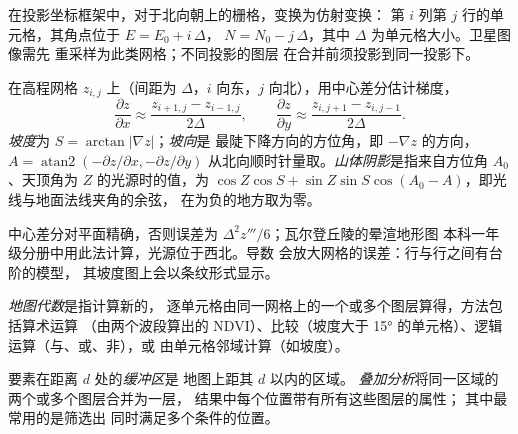 在投影坐标框架中，对于北向朝上的栅格，变换为仿射变换：
第 $i$ 列第 $j$ 行的单元格，其角点位于 $E = E_0 + i\,\Delta$，
$N = N_0 - j\,\Delta$，其中 $\Delta$ 为单元格大小。卫星图像需先
重采样为此类网格；不同投影的图层
在合并前须投影到同一投影下。

\begin{method}\label{met:b3:remote-sensing-gis:slope}
在高程网格 $z_{i,j}$ 上（间距为 $\Delta$，$i$ 向东，$j$
向北），用中心差分估计梯度，
\[
\frac{\partial z}{\partial x} \approx \frac{z_{i+1,j} - z_{i-1,j}}{2\Delta} ,
\qquad
\frac{\partial z}{\partial y} \approx \frac{z_{i,j+1} - z_{i,j-1}}{2\Delta} .
\]
\emph{坡度}为 $S = \arctan|\nabla z|$；\emph{坡向}是
最陡下降方向的方位角，即 $-\nabla z$ 的方向，$A =
\operatorname{atan2}(-\partial z/\partial x, -\partial z/\partial y)$
从北向顺时针量取。\emph{山体阴影}是指来自方位角
$A_0$、天顶角为 $Z$ 的光源时的值，为 $\cos Z\cos S + \sin Z\sin S
\cos(A_0 - A)$，即光线与地面法线夹角的余弦，
在为负的地方取为零。
\end{method}

中心差分对平面精确，否则误差为
$\Delta^2 z'''/6$；瓦尔登丘陵的晕渲地形图
本科一年级分册中用此法计算，光源位于西北。导数
会放大网格的误差：行与行之间有台阶的模型，
其坡度图上会以条纹形式显示。

\begin{definition}[地图代数]\label{def:b3:remote-sensing-gis:map-algebra}
\emph{地图代数}是指计算新的，
逐单元格由同一网格上的一个或多个图层算得，方法包括算术运算
（由两个波段算出的 NDVI）、比较（坡度大于
\ang{15} 的单元格）、逻辑运算（与、或、非），或
由单元格邻域计算（如坡度）。
\end{definition}

\begin{definition}\label{def:b3:remote-sensing-gis:operations}
要素在距离 $d$ 处的\emph{缓冲区}是
地图上距其 $d$ 以内的区域。
\emph{叠加分析}将同一区域的两个或多个图层合并为一层，
结果中每个位置带有所有这些图层的属性；
其中最常用的是筛选出
同时满足多个条件的位置。
\end{definition}

